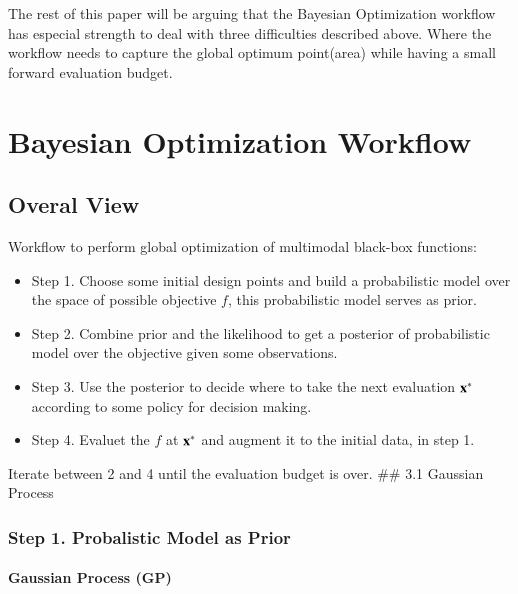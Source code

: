 \documentclass[]{elsarticle} %
\begin{document}
The rest of this paper will be arguing that the Bayesian Optimization workflow has especial strength to deal with three difficulties described above. Where the workflow needs to capture the global optimum point(area) while having a small forward evaluation budget.

\newpage

\hypertarget{bayesian-optimization-workflow}{%
\section{Bayesian Optimization Workflow}\label{bayesian-optimization-workflow}}

\hypertarget{overal-view}{%
\subsection{Overal View}\label{overal-view}}

Workflow to perform global optimization of multimodal black-box
functions:

\begin{itemize}
\item
  Step 1. Choose some initial design points and build a probabilistic
  model over the space of possible objective \(f\), this probabilistic
  model serves as prior.
\item
  Step 2. Combine prior and the likelihood to get a posterior of
  probabilistic model over the objective given some observations.
\item
  Step 3. Use the posterior to decide where to take the next
  evaluation \(\bf{x^*}\) according to some policy for decision making.
\item
  Step 4. Evaluet the \(f\) at \(\bf{x^*}\) and augment it to the initial
  data, in step 1.
\end{itemize}

Iterate between 2 and 4 until the evaluation budget is over. \#\# 3.1
Gaussian Process

\newpage

\hypertarget{step-1.-probalistic-model-as-prior}{%
\subsubsection{Step 1. Probalistic Model as Prior}\label{step-1.-probalistic-model-as-prior}}

\hypertarget{gaussian-process-gp}{%
\paragraph{Gaussian Process (GP)}\label{gaussian-process-gp}}
\end{document}
